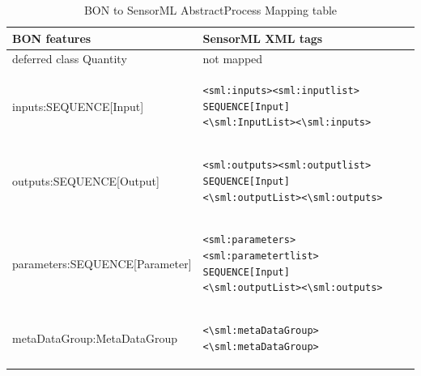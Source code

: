 \documentclass[]{final_report}
\begin{document}
\begin{table}[!th]
\centering
\begin{tabular}{|l|l|}
\hline
BON features & SensorML XML tags\\
\hline
   deferred class Quantity  & not mapped\\
\hline     
     inputs:SEQUENCE[Input] & \begin{lstlisting}
<sml:inputs><sml:inputlist>
SEQUENCE[Input]
<\sml:InputList><\sml:inputs>\end{lstlisting}\\

\hline 
     outputs:SEQUENCE[Output] & \begin{lstlisting}
<sml:outputs><sml:outputlist>
SEQUENCE[Input]
<\sml:outputList><\sml:outputs>\end{lstlisting}\\
\hline
     parameters:SEQUENCE[Parameter] & \begin{lstlisting}
<sml:parameters><sml:parametertlist>
SEQUENCE[Input]
<\sml:outputList><\sml:outputs>\end{lstlisting}\\

\hline                 
     metaDataGroup:MetaDataGroup &  \begin{lstlisting}
<\sml:metaDataGroup><\sml:metaDataGroup>\end{lstlisting}\\
 \hline    

\end{tabular}
\caption{BON to SensorML AbstractProcess Mapping table}\label{table:bon_sml_example}
\label{ex:table}
\end{table}
\end{document}

